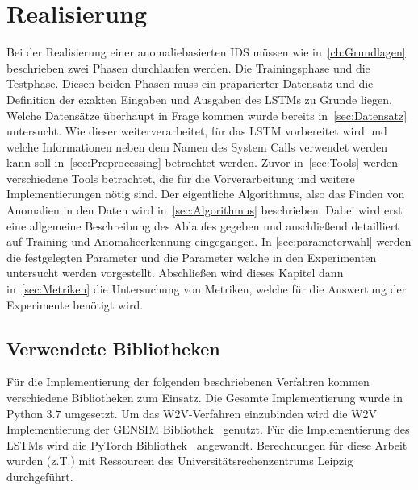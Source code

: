 \chapter{Realisierung}\label{ch:Realisierung}
    Bei der Realisierung einer anomaliebasierten \ac{IDS} müssen wie in~\autoref{ch:Grundlagen} beschrieben zwei Phasen durchlaufen werden.
    Die Trainingsphase und die Testphase.
    Diesen beiden Phasen muss ein präparierter Datensatz und die Definition der exakten Eingaben und Ausgaben des \acp{LSTM} zu Grunde liegen. 
    Welche Datensätze überhaupt in Frage kommen wurde bereits in~\autoref{sec:Datensatz} untersucht.
    Wie dieser weiterverarbeitet, für das \ac{LSTM} vorbereitet wird und welche Informationen neben dem Namen des System Calls verwendet werden kann soll in~\autoref{sec:Preprocessing} betrachtet werden.
    Zuvor in~\autoref{sec:Tools} werden verschiedene Tools betrachtet, die für die Vorverarbeitung und weitere Implementierungen nötig sind.
    Der eigentliche Algorithmus, also das Finden von Anomalien in den Daten wird in~\autoref{sec:Algorithmus} beschrieben.
    Dabei wird erst eine allgemeine Beschreibung des Ablaufes gegeben und anschließend detailliert auf Training und Anomalieerkennung eingegangen.
    In \autoref{sec:parameterwahl} werden die festgelegten Parameter und die Parameter welche in den Experimenten untersucht werden vorgestellt.
    Abschließen wird dieses Kapitel dann in~\autoref{sec:Metriken} die Untersuchung von Metriken, welche für die Auswertung der Experimente benötigt wird.

    \section{Verwendete Bibliotheken}\label{sec:Tools}
        Für die Implementierung der folgenden beschriebenen Verfahren kommen verschiedene Bibliotheken zum Einsatz.
        Die Gesamte Implementierung wurde in Python $3.7$ umgesetzt.
        Um das \ac{W2V}-Verfahren einzubinden wird die \ac{W2V} Implementierung der GENSIM Bibliothek~\cite{GENSIM} genutzt.
        Für die Implementierung des \acp{LSTM} wird die PyTorch Bibliothek~\cite{PYTORCH} angewandt. 
        Berechnungen für diese Arbeit wurden (z.T.) mit Ressourcen des Universitätsrechenzentrums Leipzig durchgeführt.

